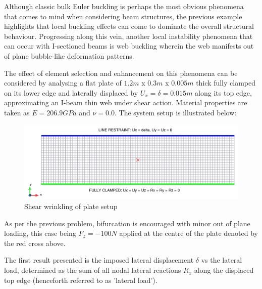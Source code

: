 Although classic bulk Euler buckling is perhaps the most obvious phenomena that comes to mind when considering beam structures, the previous example highlights that local buckling effects can come to dominate the overall structural behaviour. Progressing along this vein, another local instability phenomena that can occur with I-sectioned beams is web buckling wherein the web manifests out of plane bubble-like deformation patterns.

The effect of element selection and enhancement on this phenomena can be considered by analysing a flat plate of $1.2m$ x $0.3m$ x $0.005m$ thick fully clamped on its lower edge and laterally displaced by $U_x = \delta = 0.015m$ along its top edge, approximating an I-beam thin web under shear action. Material properties are taken as $E = 206.9 GPa$ and $\nu = 0.0$. The system setup is illustrated below:

\begin{figure}[H]
	\centering
	\includegraphics[width=14cm]{images/wrinkle_setup}
	\caption{Shear wrinkling of plate setup}
	\label{fig:wrinklesetup}
\end{figure}

As per the previous problem, bifurcation is encouraged with minor out of plane loading, this case being $F_z = -100N$ applied at the centre of the plate denoted by the red cross above. 

The first result presented is the imposed lateral displacement $\delta$ vs the lateral load, determined as the sum of all nodal lateral reactions $R_x$ along the displaced top edge (henceforth referred to as 'lateral load').

